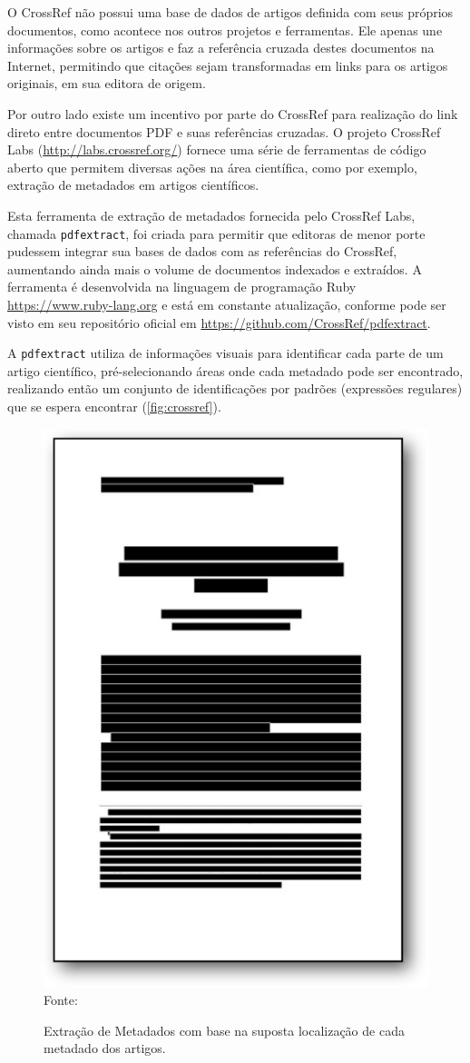 O CrossRef não possui uma base de dados de artigos definida com seus próprios documentos, como acontece nos outros projetos e ferramentas. Ele apenas une informações sobre os artigos e faz a referência cruzada destes documentos na Internet, permitindo que citações sejam transformadas em links para os artigos originais, em sua editora de origem.

Por outro lado existe um incentivo por parte do CrossRef para realização do link direto entre documentos PDF e suas referências cruzadas. O projeto CrossRef Labs (\url{http://labs.crossref.org/}) fornece uma série de ferramentas de código aberto que permitem diversas ações na área científica, como por exemplo, extração de metadados em artigos científicos.

Esta ferramenta de extração de metadados fornecida pelo CrossRef Labs, chamada \texttt{pdfextract}, foi criada para permitir que editoras de menor porte pudessem integrar sua bases de dados com as referências do CrossRef, aumentando ainda mais o volume de documentos indexados e extraídos. A ferramenta é desenvolvida na linguagem de programação Ruby \url{https://www.ruby-lang.org} e está em constante atualização, conforme pode ser visto em seu repositório oficial em \url{https://github.com/CrossRef/pdfextract}.

A \texttt{pdfextract} utiliza de informações visuais para identificar cada parte de um artigo científico, pré-selecionando áreas onde cada metadado pode ser encontrado, realizando então um conjunto de identificações por padrões (expressões regulares) que se espera encontrar (\autoref{fig:crossref}).

\begin{figure}[h!]
    \centering
    \caption{Extração de Metadados com base na suposta localização de cada metadado dos artigos.}
    \label{fig:crossref}
    \includegraphics[width=0.6\linewidth]{./assets/images/crossref}
    \center\footnotesize{Fonte: \cite{CrossRef-2009}}
\end{figure}

